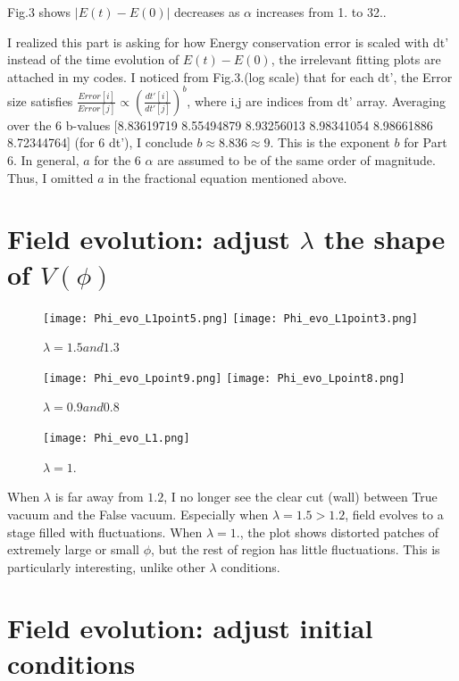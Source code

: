 \documentclass{article}
\begin{document}
Fig.3 shows $|E(t) - E(0)|$ decreases as $\alpha$ increases from 1. to 32..

 I realized this part is asking for how Energy conservation error is scaled with dt' instead of the time evolution of $E(t) - E(0)$, the irrelevant fitting plots are attached in my codes. I noticed from Fig.3.(log scale) that for each dt', the Error size satisfies $\frac{Error[i]}{Error[j]}\propto({\frac{dt'[i]}{dt'[j]}})^{b}$, where i,j are indices from dt' array. Averaging over the 6 b-values [8.83619719 8.55494879 8.93256013 8.98341054 8.98661886 8.72344764] (for 6 dt'), I conclude $b\approx8.836\approx9$. This is the exponent $b$ for Part 6. In general, $a$ for the 6 $\alpha$ are assumed to be of the same order of magnitude. Thus, I omitted $a$ in the fractional equation mentioned above.  

\vspace{3mm}


\section{Field evolution: adjust $\lambda$ the shape of $V(\phi)$}

\begin{figure}[H]
    \centering
    \texttt{[image: Phi\_evo\_L1point5.png]}
    \texttt{[image: Phi\_evo\_L1point3.png]}
    \caption{$\lambda=1.5 and 1.3$}
    \label{fig:Q1}
\end{figure}

\begin{figure}[H]
    \centering
    \texttt{[image: Phi\_evo\_Lpoint9.png]}
    \texttt{[image: Phi\_evo\_Lpoint8.png]}
    \caption{$\lambda=0.9 and 0.8$}
    \label{fig:Q1}
\end{figure}

\begin{figure}[H]
    \centering
    \texttt{[image: Phi\_evo\_L1.png]}
    \caption{$\lambda=1.$}
    \label{fig:Q1}
\end{figure}

When $\lambda$ is far away from $1.2$, I no longer see the clear cut (wall) between True vacuum and the False vacuum. Especially when $\lambda=1.5>1.2$, field evolves to a stage filled with fluctuations.
When $\lambda=1.$, the plot shows distorted patches of extremely large or small $\phi$, but the rest of region has little fluctuations. This is particularly interesting, unlike other $\lambda$ conditions.

\section{Field evolution: adjust initial conditions}
\end{document}
